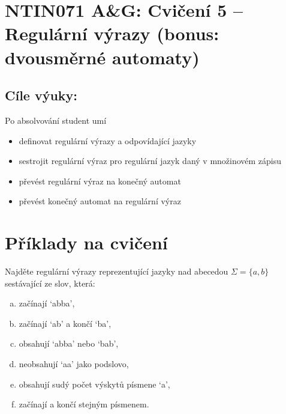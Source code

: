 \documentclass[a4paper,12pt]{amsart}
\begin{document}
\thispagestyle{empty}

\section*{NTIN071 A\&G: Cvičení 5 -- Regulární výrazy (bonus: dvousměrné automaty)}

\medskip

\subsection*{Cíle výuky:} Po absolvování student umí

\begin{itemize}\setlength{\itemsep}{0pt}
    \item definovat regulární výrazy a odpovídající jazyky
    \item sestrojit regulární výraz pro regulární jazyk daný v množinovém zápisu
    \item převést regulární výraz na konečný automat
    \item převést konečný automat na regulární výraz
\end{itemize}


\medskip

\section*{Příklady na cvičení}

\medskip\begin{problem}

    Najděte regulární výrazy reprezentující jazyky nad abecedou $\Sigma = \{a, b\}$ sestávající ze slov, která:

    \begin{multicols}{2}

        \begin{enumerate}[(a)]\setlength\itemsep{0pt}
            \item začínají `abba',
            \item začínají `ab' a končí `ba',
            \item obsahují `abba' nebo `bab',
            \item neobsahují `aa' jako podslovo,
            \item obsahují sudý počet výskytů písmene `a',
            \item začínají a končí stejným písmenem.
        \end{enumerate}

    \end{multicols}

\end{problem}
\end{document}
